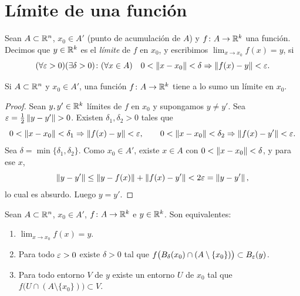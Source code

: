 \section{Límite de una función}

\begin{definition}[Límite]
  Sean \(A \subset \mathbb{R}^n\), \(x_0 \in A'\) (punto de acumulación de \(A\)) y \(f\colon A \to \mathbb{R}^k\) una función. Decimos que \(y \in \mathbb{R}^k\) es el \emph{límite} de \(f\) en \(x_0\), y escribimos \(\lim_{x \to x_0} f(x) = y\), si
  \[
    (\forall \varepsilon > 0)(\exists \delta > 0) \colon (\forall x \in A) \quad 0 < \left\lVert x - x_0 \right\rVert < \delta \Rightarrow \left\lVert f(x) - y \right\rVert < \varepsilon.
  \]
\end{definition}

\begin{lemma}
  Si \(A \subset \mathbb{R}^n\) y \(x_0 \in A'\), una función \(f\colon A \to \mathbb{R}^k\) tiene a lo sumo un límite en \(x_0\).
\end{lemma}

\begin{proof}
  Sean \(y, y' \in \mathbb{R}^k\) límites de \(f\) en \(x_0\) y supongamos \(y \neq y'\). Sea \(\varepsilon = \frac{1}{2} \left\lVert y - y' \right\rVert > 0\). Existen \(\delta_1, \delta_2 > 0\) tales que
  \[
    0 < \left\lVert x - x_0 \right\rVert < \delta_1 \Rightarrow \left\lVert f(x) - y \right\rVert < \varepsilon, \qquad 0 < \left\lVert x - x_0 \right\rVert < \delta_2 \Rightarrow \left\lVert f(x) - y' \right\rVert < \varepsilon.
  \]
  Sea \(\delta = \min\{\delta_1, \delta_2\}\). Como \(x_0 \in A'\), existe \(x \in A\) con \(0 < \left\lVert x - x_0 \right\rVert < \delta\), y para ese \(x\),
  \[
    \left\lVert y - y' \right\rVert \leq \left\lVert y - f(x) \right\rVert + \left\lVert f(x) - y' \right\rVert < 2\varepsilon = \left\lVert y - y' \right\rVert,
  \]
  lo cual es absurdo. Luego \(y = y'\).
\end{proof}

\begin{prop}
  Sean \(A \subset \mathbb{R}^n\), \(x_0 \in A'\), \(f\colon A \to \mathbb{R}^k\) e \(y \in \mathbb{R}^k\). Son equivalentes:
  \begin{enumerate}[label=(\arabic*)]
    \item \(\lim_{x \to x_0} f(x) = y\).
    \item Para todo \(\varepsilon > 0\) existe \(\delta > 0\) tal que \(f\bigl( B_{\delta}(x_0) \cap (A \setminus \{x_0\}) \bigr) \subset B_{\varepsilon}(y)\).
    \item Para todo entorno \(V\) de \(y\) existe un entorno \(U\) de \(x_0\) tal que \(f\bigl( U \cap (A \setminus \{x_0\}) \bigr) \subset V\).
  \end{enumerate}
\end{prop}

